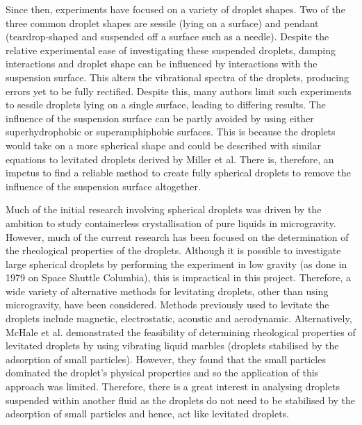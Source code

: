 \documentclass{physics_article_B}
\begin{document}
    Since then, experiments have focused on a variety of droplet shapes. Two of the three common droplet shapes are sessile (lying on a surface)\cite{vukasinovic, Backholm2017, Temperton2012} and pendant (teardrop-shaped and suspended off a surface such as a needle)\cite{Temperton2012}. Despite the relative experimental ease of investigating these suspended droplets, damping interactions and droplet shape can be influenced by interactions with the suspension surface\cite{Sharp2011}. This alters the vibrational spectra of the droplets, producing errors yet to be fully rectified\cite{harrold}. Despite this, many authors limit such experiments to sessile droplets lying on a single surface\cite{Sharp2011}, leading to differing results. The influence of the suspension surface can be partly avoided by using either superhydrophobic or superamphiphobic surfaces\cite{harrold}. This is because the droplets would take on a more spherical shape and could be described with similar equations to levitated droplets derived by Miller et al. There is, therefore, an impetus to find a reliable method to create fully spherical droplets to remove the influence of the suspension surface altogether.
    
    Much of the initial research involving spherical droplets was driven by the ambition to study containerless crystallisation of pure liquids in microgravity\cite{wilkes}. However, much of the current research has been focused on the determination of the rheological properties of the droplets\cite{harrold2,benmore,capillary}. Although it is possible to investigate large spherical droplets by performing the experiment in low gravity (as done in 1979\cite{holt} on Space Shuttle Columbia), this is impractical in this project. Therefore, a wide variety of alternative methods for levitating droplets, other than using microgravity, have been considered. Methods previously used to levitate the droplets include magnetic\cite{temperton, hill}, electrostatic\cite{mugele, wong}, acoustic\cite{trinh, Yarin1998} and aerodynamic\cite{benmore}. Alternatively, McHale et al. demonstrated the feasibility of determining rheological properties of levitated droplets by using vibrating liquid marbles (droplets stabilised by the adsorption of small particles). However, they found that the small particles dominated the droplet's physical properties and so the application of this approach was limited\cite{mchale}. Therefore, there is a great interest in analysing droplets suspended within another fluid as the droplets do not need to be stabilised by the adsorption of small particles and hence, act like levitated droplets. 
    
\end{document}

